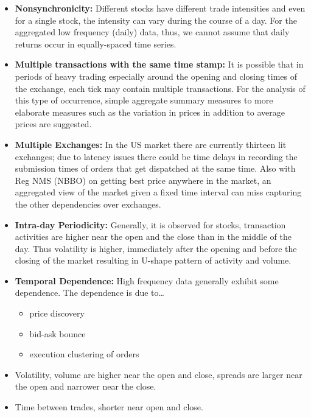 \begin{itemize}
\item \textbf{Nonsynchronicity:} Different stocks have different trade intensities and even for a single stock, the intensity can vary during the course of a day. For the aggregated low frequency (daily) data, thus, we cannot assume that daily returns occur in equally-spaced time series.

\item \textbf{Multiple transactions with the same time stamp:} It is possible that in periods of heavy trading especially around the opening and closing times of the exchange, each tick may contain multiple transactions. For the analysis of this type of occurrence, simple aggregate summary measures to more elaborate measures such as the variation in prices in addition to average prices are suggested.

\item \textbf{Multiple Exchanges:} In the US market there are currently thirteen lit exchanges; due to latency issues there could be time delays in recording the submission times of orders that get dispatched at the same time. Also with Reg NMS (NBBO) on getting best price anywhere in the market, an aggregated view of the market given a fixed time interval can miss capturing the other dependencies over exchanges. 

\item \textbf{Intra-day Periodicity:} Generally, it is observed for stocks, transaction activities are higher near the open and the close than in the middle of the day. Thus volatility is higher, immediately after the opening and before the closing of the market resulting in U-shape pattern of activity and volume.

\item \textbf{Temporal Dependence:} High frequency data generally exhibit some dependence. The dependence is due to\dots
        \begin{itemize}
        \item price discovery
        \item bid-ask bounce
        \item execution clustering of orders
        \end{itemize}

\item Volatility, volume are higher near the open and close, spreads are larger near the open and narrower near the close.

\item Time between trades, shorter near open and close.
\end{itemize}


